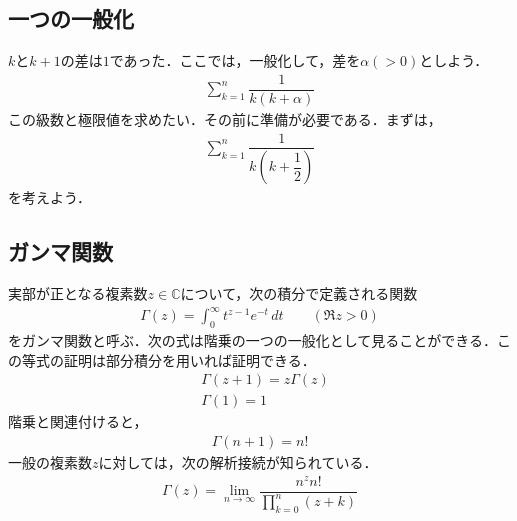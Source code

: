 \documentclass[12pt]{jsarticle}
\begin{document}
\subsection*{一つの一般化}
$k$と$k+1$の差は$1$であった．ここでは，一般化して，差を$\alpha(>0)$としよう．
\begin{align*}
\sum_{k=1}^{n} \dfrac{1}{k(k+\alpha)}
\end{align*}
この級数と極限値を求めたい．その前に準備が必要である．まずは，
\begin{align*}
\sum_{k=1}^{n} \dfrac{1}{k\left(k+\dfrac{1}{2}\right)}
\end{align*}
を考えよう．

\subsection*{ガンマ関数}
実部が正となる複素数$z \in \mathbb{C}$について，次の積分で定義される関数
\begin{align*}
\Gamma (z)=\int _{0}^{\infty }t^{z-1}e^{-t}\,dt\qquad (\Re {z}>0)
\end{align*}
をガンマ関数と呼ぶ．次の式は階乗の一つの一般化として見ることができる．この等式の証明は部分積分を用いれば証明できる．
\begin{align*}
&\Gamma (z+1)=z\Gamma (z)\\
&\Gamma (1) = 1
\end{align*}
階乗と関連付けると，
\begin{align*}
\Gamma (n+1)=n!
\end{align*}
一般の複素数$z$に対しては，次の解析接続が知られている．
\begin{align*}
\Gamma (z)=\lim _{n\to \infty }{\dfrac {n^{z}n!}{\prod_{k=0}^{n}{(z+k)}}}
\end{align*}
\end{document}
